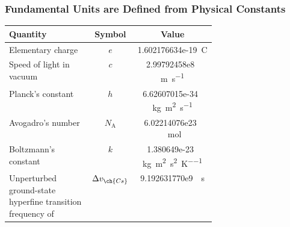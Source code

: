 \documentclass[10pt,letterpaper,twoside]{article}
\begin{document}
\begin{frame}[c]
	\frametitle{Fundamental Units are Defined from Physical Constants}

	\begin{center}
		\renewcommand\arraystretch{1.1}
		\begin{tabular}
			{>{\raggedright\arraybackslash}m{0.4\linewidth}cS}
			\toprule
			\bfseries Quantity & \bfseries Symbol & \bfseries Value \\ \midrule
			Elementary charge & $e$ & 1.602176634e-19 \,\si{\coulomb} \\
			Speed of light in vacuum & $c$ & 2.99792458e8 \,\si{\meter\per\second} \\
			Planck's constant & $h$ & 6.62607015e-34 \,\si{\kilo\gram\meter\squared\per\second} \\
			Avogadro's number & $N_{\textrm{A}}$ & 6.02214076e23 \,\si{\per\mole} \\
			Boltzmann's constant & $k$ & 1.380649e-23 \,\si{\kilo\gram\meter\squared\per\second\squared\per\kelvin} \\
			Unperturbed ground-state hyperfine transition frequency of  & $\Delta v_{\ch{Cs}}$
												 & 9.192631770e9
												 \,\si{\per\second}
			\\
			\bottomrule
		\end{tabular}
	\end{center}
\end{frame}
\end{document}
